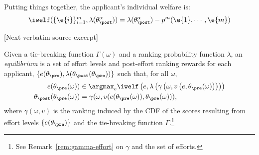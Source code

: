 \documentclass[10pt]{article}
\begin{document}
\begin{ReviewVerbatim}
Putting things together, the applicant's individual welfare is:
\begin{equation*}
\iwelf(\{ \e{i} \}_{i=1}^m, \lambda(\theta_\post^\alpha)) = \lambda(\theta_\post^\alpha) - p^m( \e{1}, \cdots, \e{m})
\end{equation*}

[Next verbatim source excerpt]

\begin{definition} [Equilibrium]\label{def:equi}
{Given a}
tie-breaking function $\Gamma(\omega)$
%
{and}
	a ranking probability function $\lambda$, an \textit{equilibrium} is a set of effort levels and post-effort ranking rewards for each applicant, $\{e(\theta_\pre),  \lambda(\theta_\post(\theta_\pre))\}$ such that, for all
	$\omega$, %
	\begin{align*}
		e(\theta_\pre(\omega)) &\in \argmax_{e} \iwelf\left(e, \lambda\left(\gamma\left(\omega, v\left(e,\theta_\pre(\omega)\right)\right)\right)\right) %
		\\
		\theta_\post(\theta_\pre(\omega)) &= \gamma(\omega, v(e(\theta_\pre(\omega)),\theta_\pre(\omega))),
	\end{align*}
	{where $\gamma(\omega,v)$ is the ranking induced by the CDF of the scores resulting from effort levels $\{e(\theta_\pre)\}$ and the tie-breaking function $\Gamma$.\footnote{See Remark~\ref{rem:gamma-effort} on $\gamma$ and the set of efforts.%
	}
	}
\end{definition}


\end{ReviewVerbatim}
\end{document}
